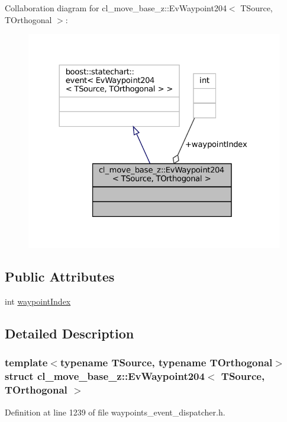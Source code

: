 Collaboration diagram for cl\+\_\+move\+\_\+base\+\_\+z\+:\+:Ev\+Waypoint204$<$ T\+Source, T\+Orthogonal $>$\+:
\nopagebreak
\begin{figure}[H]
\begin{center}
\leavevmode
\includegraphics[width=324pt]{structcl__move__base__z_1_1EvWaypoint204__coll__graph}
\end{center}
\end{figure}
\subsection*{Public Attributes}
\begin{DoxyCompactItemize}
\item 
int \hyperlink{structcl__move__base__z_1_1EvWaypoint204_a89f5e0fca56bae75eb81cd0dc6ad3153}{waypoint\+Index}
\end{DoxyCompactItemize}


\subsection{Detailed Description}
\subsubsection*{template$<$typename T\+Source, typename T\+Orthogonal$>$\newline
struct cl\+\_\+move\+\_\+base\+\_\+z\+::\+Ev\+Waypoint204$<$ T\+Source, T\+Orthogonal $>$}



Definition at line 1239 of file waypoints\+\_\+event\+\_\+dispatcher.\+h.



